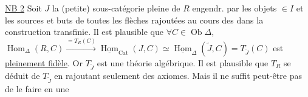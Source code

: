 \uline{NB 2} Soit $J$ la (petite) sous-catégorie pleine de $R$ engendr. par les objets $\in I$ et les  sources et buts de toutes les flèches rajoutées au cours des  dans la construction transfinie. Il est plausible que $\forall C\in\operatorname{Ob}\Delta$, $\operatorname{Hom}_\Delta(R,C)\overset{=T_R(C)}{\longrightarrow}\underline{\operatorname{Hom}}_{\mathrm{Cat}}(J,C)\simeq\underline{\operatorname{Hom}}_\Delta(\widetilde J,C)=T_{\widetilde J}(C)$ est \uline{pleinement fidèle}.  Or $T_{\widetilde J}$ est une théorie algébrique. Il est plausible  que  $T_R$ se déduit de $T_{\widetilde J}$  en rajoutant seulement des axiomes. Mais il ne suffit peut-être pas de le faire en une
